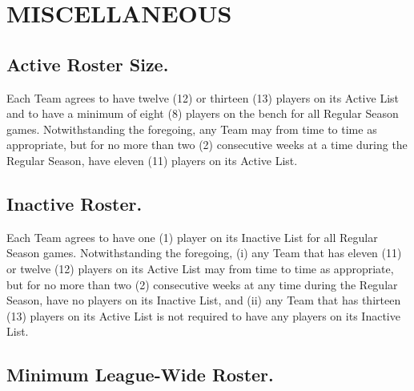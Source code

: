 \documentclass[
]{book}
\begin{document}
\hypertarget{miscellaneous}{%
\chapter{MISCELLANEOUS}\label{miscellaneous}}

\hypertarget{active-roster-size.}{%
\section{Active Roster Size.}\label{active-roster-size.}}

Each Team agrees to have twelve (12) or thirteen (13) players on its Active List and to have a minimum of eight (8) players on the bench for all Regular Season games. Notwithstanding the foregoing, any Team may from time to time as appropriate, but for no more than two (2) consecutive weeks at a time during the Regular Season, have eleven (11) players on its Active List.

\hypertarget{inactive-roster.}{%
\section{Inactive Roster.}\label{inactive-roster.}}

Each Team agrees to have one (1) player on its Inactive List for all Regular Season games. Notwithstanding the foregoing, (i) any Team that has eleven (11) or twelve (12) players on its Active List may from time to time as appropriate, but for no more than two (2) consecutive weeks at any time during the Regular Season, have no players on its Inactive List, and (ii) any Team that has thirteen (13) players on its Active List is not required to have any players on its Inactive List.

\hypertarget{minimum-league-wide-roster.}{%
\section{Minimum League-Wide Roster.}\label{minimum-league-wide-roster.}}
\end{document}
